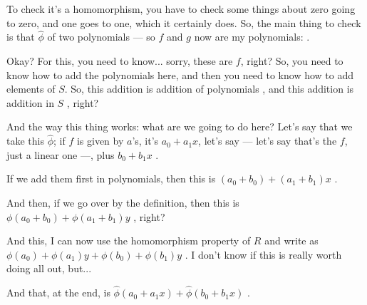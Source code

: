 \begin{proofWrapper}
\begin{hidden}
\end{hidden}

\begin{speech}[00:12:20 - 00:14:25]
To check it's a homomorphism, you have to check some things about zero going to zero, and one goes to one, which it certainly does. So, the main thing to check is that $\hat{\phi}$ of two polynomials --- so $f$ and $g$ now are my polynomials: .

Okay? For this, you need to know... sorry, these are $f$, right? So, you need to know how to add the polynomials here, and then you need to know how to add elements of $S$. So, this addition is addition of polynomials , and this addition is addition in $S$ , right?

And the way this thing works: what are we going to do here? Let's say that we take this $\hat{\phi}$; if $f$ is given by $a$'s, it's $a_0 + a_1 x$, let's say --- let's say that's the $f$, just a linear one ---, plus $b_0 + b_1 x$ .

If we add them first in polynomials, then this is $(a_0 + b_0) + (a_1 + b_1) x$ .

And then, if we go over by the definition, then this is $\phi(a_0 + b_0) + \phi(a_1 + b_1) y$ , right?
\end{speech}

\begin{speech}[00:14:25 - 00:16:30]
And this, I can now use the homomorphism property of $R$ and write as $\phi(a_0) + \phi(a_1) y + \phi(b_0) + \phi(b_1) y$ . I don't know if this is really worth doing all out, but...

And that, at the end, is $\hat{\phi}(a_0 + a_1 x) + \hat{\phi}(b_0 + b_1 x)$ .


\end{speech}
\end{proofWrapper}
